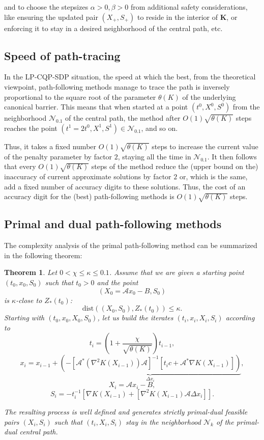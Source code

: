 \documentclass[11pt,a4paper]{article}
\newtheorem{theorem}[thm]{Theorem}
\begin{document}
and to choose the stepsizes $\alpha >0,\beta>0$ from additional safety considerations, like ensuring the updated pair $(X_+, S_+)$ to reside in the interior of $\textbf{K}$, or enforcing it to stay in a desired neighborhood of the central path, etc.

\subsection{Speed of path-tracing}

In the LP-CQP-SDP situation, the speed at which the best, from the theoretical viewpoint, path-following methods manage to trace the path is inversely proportional to the square root of the parameter $\theta(K)$ of the underlying canonical barrier. This means that when started at a point $(t^0, X^0, S^0)$ from the neighborhood $\mathcal{N}_{0.1}$ of the central path, the method after $O(1)\sqrt{\theta(K)}$ steps reaches the point $(t^1=2t^0, X^1, S^1) \in \mathcal{N}_{0.1}$, and so on.

Thus, it takes a fixed number $O(1)\sqrt{\theta(K)}$ steps to increase the current value of the penalty parameter by factor $2$, staying all the time in $\mathcal{N}_0.1$. It then follows that every $O(1)\sqrt{\theta(K)}$ steps of the method reduce the (upper bound on the) inaccuracy of current approximate solutions by factor $2$ or, which is the same, add a fixed number of accuracy digits to these solutions. Thus, the cost of an accuracy digit for the (best) path-following methods is $O(1)\sqrt{\theta(K)}$ steps.


\subsection{Primal and dual path-following methods}

The complexity analysis of the primal path-following method can be summarized in
the following theorem:

\begin{theorem}
    Let $0<\chi \leq \kappa\leq0.1$. Assume that we are given a starting point $(t_0, x_0, S_0)$ such that $t_0 > 0$ and the point 
    \[(X_0 = \mathcal{A}x_0-B, S_0)\]
    is $\kappa$-close to $Z_*(t_0)$:
    \[\text{dist}((X_0,S_0), Z_*(t_0)) \leq \kappa.\]
    Starting with $(t_0, x_0, X_0, S_0)$, let us build the iterates $(t_i, x_i, X_i, S_i)$ according to 
    \[t_i = \left(1+\frac{\chi}{\sqrt{\theta(K)}}\right)t_{i-1},\]
    \[x_i = x_{i-1}+\underbrace{(-[\mathcal{A}^*(\nabla^2K(X_{i-1}))\mathcal{A}]^{-1}[t_ic+\mathcal{A}^*\nabla K(X_{i-1})])}_{\Delta x_i},\]
    \[X_i = \mathcal{A}x_i - B,\]
    \[S_i = -t_i^{-1}[\nabla K(X_{i-1})+[\nabla^2 K(X_{i-1})\mathcal{A}\Delta x_i]].\]
    
    The resulting process is well defined and generates strictly primal-dual feasible pairs $(X_i, S_i)$ such that $(t_i, X_i, S_i)$ stay in the neighborhood $\mathcal{N}_k$ of the primal-dual central path.
\end{theorem}
\end{document}
